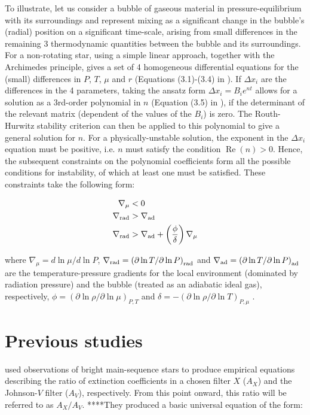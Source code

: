 \documentclass[12pt, a4paper]{report}
\begin{document}
To illustrate, let us consider a bubble of gaseous material in pressure-equilibrium with its surroundings and represent mixing as a significant change in the bubble's (radial) position on a significant time-scale, arising from small differences in the remaining 3 thermodynamic quantities between the bubble and its surroundings. For a non-rotating star, using a simple linear approach, together with the Archimedes principle, gives a set of 4 homogeneous differential equations for the (small) differences in $P$, $T$, $\mu$ and $r$ (Equations (3.1)-(3.4) in \cite{2017RSOS....470192S}). If $\Delta x_{i}$ are the differences in the 4 parameters, taking the ansatz form $\Delta x_{i} = B_{i} e^{nt}$ allows for a solution as a 3rd-order polynomial in $n$ (Equation (3.5) in \cite{2017RSOS....470192S}), if the determinant of the relevant matrix (dependent of the values of the $B_{i}$) is zero. The Routh-Hurwitz stability criterion can then be applied to this polynomial to give a general solution for $n$. For a physically-unstable solution, the exponent in the $\Delta x_{i}$ equation must be positive, i.e. $n$ must satisfy the condition $\operatorname{Re}(n) > 0$. Hence, the subsequent constraints on the polynomial coefficients form all the possible conditions for instability,  of which at least one must be satisfied. These constraints take the following form:

\begin{align}
\nabla _{\mu} &< 0 \label{mu_inv_ineq} \\
\nabla _{\textnormal{rad}} &> \nabla _{\textnormal{ad}} \label{schwarz_ineq} \\
\nabla _{\textnormal{rad}} &> \nabla _{\textnormal{ad}} + \left( \frac{\phi}{\delta} \right) \nabla _{\mu} \label{ledoux_ineq}
\end{align}

where $\nabla _{\mu} = d\ln\mu / d\ln P$, $\nabla _{\textnormal{rad}} = \left(\partial\ln T / \partial\ln P \right)_{\textnormal{rad}}$ and $\nabla _{\textnormal{ad}} = \left(\partial\ln T / \partial\ln P \right)_{\textnormal{ad}}$ are the temperature-pressure gradients for the local environment (dominated by radiation pressure) and the bubble (treated as an adiabatic ideal gas), respectively, $\phi = \left( \partial \ln\rho / \partial \ln\mu \right)_{P,T}$ and $\delta = -\left( \partial \ln\rho / \partial \ln T \right)_{P,\mu}$  \citep{1980A&A....91..175K}.

\section{Previous studies}
\cite{1989ApJ...345..245C} used observations of bright main-sequence stars to produce empirical equations describing the ratio of extinction coefficients in a chosen filter $X$ ($A_{X}$) and the Johnson-$V$ filter ($A_{V}$), respectively. From this point onward, this ratio will be referred to as $A_{X}/A_{V}$. ****They produced a basic universal equation of the form:
\end{document}
